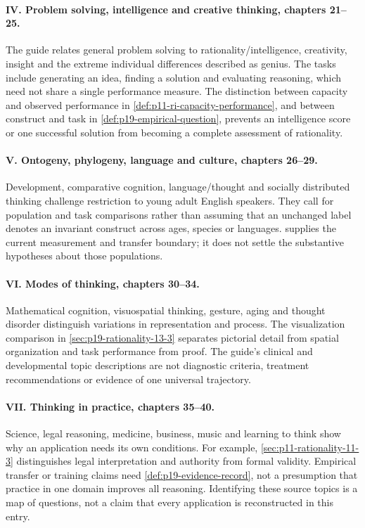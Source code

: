 \paragraph{IV. Problem solving, intelligence and creative thinking, chapters 21--25.}
The guide relates general problem solving to rationality/intelligence,
creativity, insight and the extreme individual differences described as
genius. The tasks include generating an idea, finding a solution and evaluating
reasoning, which need not share a single performance measure. The distinction
between capacity and observed performance in
\cref{def:p11-ri-capacity-performance}, and between construct and task
in \cref{def:p19-empirical-question}, prevents an intelligence score or
one successful solution from becoming a complete assessment of rationality.

\paragraph{V. Ontogeny, phylogeny, language and culture, chapters 26--29.}
Development, comparative cognition, language/thought and socially distributed
thinking challenge restriction to young adult English speakers. They call
for population and task comparisons rather than assuming that an unchanged
label denotes an invariant construct across ages, species or languages.
supplies the current measurement and transfer boundary; it does not settle
the substantive hypotheses about those populations.

\paragraph{VI. Modes of thinking, chapters 30--34.}
Mathematical cognition, visuospatial thinking, gesture, aging and thought
disorder distinguish variations in representation and process. The
visualization comparison in \cref{sec:p19-rationality-13-3} separates
pictorial detail from spatial organization and task performance from proof.
The guide's clinical and developmental topic descriptions are not diagnostic
criteria, treatment recommendations or evidence of one universal trajectory.

\paragraph{VII. Thinking in practice, chapters 35--40.}
Science, legal reasoning, medicine, business, music and learning to think
show why an application needs its own conditions. For example,
\cref{sec:p11-rationality-11-3} distinguishes legal interpretation and
authority from formal validity. Empirical transfer or training claims need
\cref{def:p19-evidence-record}, not a presumption that practice in one
domain improves all reasoning. Identifying these source topics is a map of
questions, not a claim that every application is reconstructed in this entry.
\parencite[pp.~4--6]{HolyoakMorrison2012ReadersGuide}

